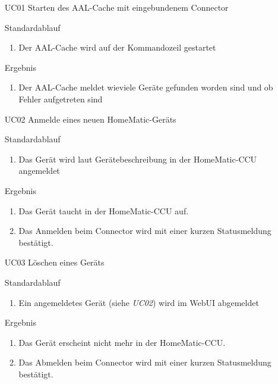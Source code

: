 \begin{itemize}
\item[UC01] Starten des AAL-Cache mit eingebundenem Connector
\item[Standardablauf]
 \begin{enumerate}
 \item Der AAL-Cache wird auf der Kommandozeil gestartet
 \end{enumerate}
\item[Ergebnis]
 \begin{enumerate}
 \item Der AAL-Cache meldet wieviele Geräte gefunden worden sind und ob Fehler aufgetreten sind
 \end{enumerate}
\end{itemize}

\begin{itemize}
\item[UC02] Anmelde eines neuen HomeMatic-Geräts
\item[Standardablauf]
 \begin{enumerate}
 \item Das Gerät wird laut Gerätebeschreibung in der HomeMatic-CCU angemeldet
 \end{enumerate}
\item[Ergebnis]
 \begin{enumerate}
 \item Das Gerät taucht in der HomeMatic-CCU auf. 
 \item Das Anmelden beim Connector wird mit einer kurzen Statusmeldung bestätigt.
 \end{enumerate}
\end{itemize}

\begin{itemize}
\item[UC03] Löschen eines Geräts
\item[Standardablauf]
 \begin{enumerate}
 \item Ein angemeldetes Gerät (siehe \emph{UC02}) wird im WebUI abgemeldet
 \end{enumerate}
\item[Ergebnis]
 \begin{enumerate}
 \item Das Gerät erscheint nicht mehr in der HomeMatic-CCU.
 \item Das Abmelden beim Connector wird mit einer kurzen Statusmeldung bestätigt.
 \end{enumerate}
\end{itemize}

